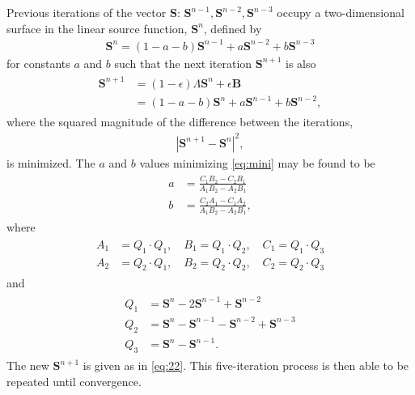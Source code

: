 \documentclass[12pt]{article}
\begin{document}
Previous iterations of the vector $\mathbf{S}$: $\mathbf{S}^{n-1}, \mathbf{S}^{n-2}, \mathbf{S}^{n-3}$ occupy a two-dimensional surface in the linear source function, $\mathbf{S}^n$, defined by
\begin{align}
\mathbf{S}^n = (1 - a - b) \mathbf{S}^{n-1} + a \mathbf{S}^{n-2} + b \mathbf{S}^{n-3}
\end{align}
for constants $a$ and $b$ such that the next iteration $\mathbf{S}^{n + 1}$ is also
\begin{align}
\begin{split}
\mathbf{S}^{n + 1}
&= (1 - \epsilon) \Lambda \mathbf{S}^n + \epsilon \mathbf{B}
\\
& = (1 - a - b) \mathbf{S}^n + a \mathbf{S}^{n - 1} + b \mathbf{S}^{n - 2},
\label{eq:22}
\end{split}
\end{align}
where the squared magnitude of the difference between the iterations,
\begin{align}
| \mathbf{S}^{n + 1} - \mathbf{S}^n |^2,
\label{eq:mini}
\end{align}
is minimized. The $a$ and $b$ values minimizing \autoref{eq:mini} may be found to be
\begin{align}
\begin{split}
a &= \frac{C_1 B_2 - C_2 B_1}{A_1 B_2 - A_2 B_1}
\\
b &= \frac{C_2 A_1 - C_1 A_2}{A_1 B_2 - A_2 B_1},
\end{split}
\end{align}
where
\begin{align}
\begin{split}
A_1 &= Q_1 \cdot Q_1, \quad B_1 = Q_1 \cdot Q_2, \quad C_1 = Q_1 \cdot Q_3
\\
A_2 &= Q_2 \cdot Q_1, \quad B_2 = Q_2 \cdot Q_2, \quad C_2 = Q_2 \cdot Q_3
\end{split}
\end{align}
and
\begin{align}
\begin{split}
Q_1 &= \mathbf{S}^n - 2 \mathbf{S}^{n - 1} + \mathbf{S}^{n - 2}
\\
Q_2 &= \mathbf{S}^n - \mathbf{S}^{n - 1} - \mathbf{S}^{n - 2} + \mathbf{S}^{n - 3}
\\
Q_3 &= \mathbf{S}^n - \mathbf{S}^{n - 1}.
\end{split}
\end{align}
The new $\mathbf{S}^{n + 1}$ is given as in \autoref{eq:22}. This five-iteration process is then able to be repeated until convergence.
\end{document}
